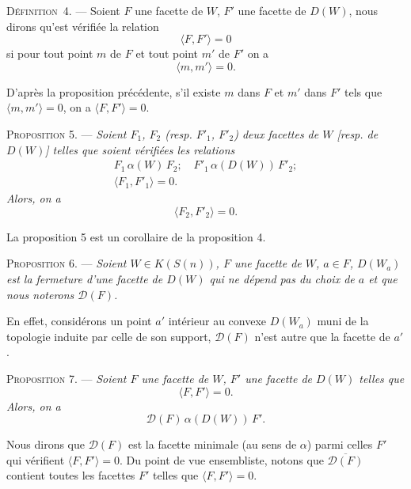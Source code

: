 \documentclass[11pt]{article}
\newcommand{\bzcf}[2]{#1}
\newcommand{\Dc}{\mathcal{D}}
\newcommand{\bznum}[1]{\if\relax\detokenize{#1}\relax\else\ #1\fi}
\newenvironment{defin}[1][]{\par\medskip\noindent\textsc{Définition\bznum{#1}.} --- }{\par\medskip}
\newenvironment{prop}[1][]{\par\medskip\noindent\textsc{Proposition #1.} --- \itshape}{\par\medskip}
\newenvironment{proof}[1][]{\par}{\par}
\begin{document}
\begin{defin}[4]
Soient $F$ une facette de $W$, $F'$ une facette de $D(W)$, nous dirons qu'est vérifiée la
relation
\[ \langle F, F'\rangle=0 \]
si pour tout point $m$ de $F$ et tout point $m'$ de $F'$ on a
\[ \langle m, m'\rangle=0. \]
\end{defin}

D'après \bzcf{la proposition précédente}{\ref{bzprop:c3s4p4_orthogonalite_facettes}}, s'il existe
$m$ dans $F$ et $m'$ dans $F'$ tels que $\langle m, m'\rangle=0$, on a $\langle F, F'\rangle=0$.

\begin{prop}[5]
Soient $F_1$, $F_2$ (resp. $F'_1$, $F'_2$) deux facettes de $W$ [resp. de $D(W)$] telles que soient
vérifiées les relations
\[ \begin{gathered} F_1\,\alpha(W)\,F_2;\quad F'_1\,\alpha(D(W))\,F'_2;\\ \langle F_1,
F'_1\rangle=0. \end{gathered} \]
Alors, on a
\[ \langle F_2, F'_2\rangle=0. \]
\end{prop}

\begin{proof}
La proposition 5 est un corollaire de \bzcf{la proposition
4}{\ref{bzprop:c3s4p4_orthogonalite_facettes}}.
\end{proof}

\begin{prop}[6]
Soient $W\in K(S(n))$, $F$ une facette de $W$, $a\in F$, $D(W_a)$ est la fermeture d'une facette
de $D(W)$ qui ne dépend pas du choix de $a$ et que nous noterons $\Dc(F)$.
\end{prop}

\begin{proof}
En effet, considérons un point $a'$ intérieur au convexe $D(W_a)$ muni de la topologie induite par
celle de son support, $\Dc(F)$ n'est autre que la facette de $a'$.
\end{proof}

\begin{prop}[7]
Soient $F$ une facette de $W$, $F'$ une facette de $D(W)$ telles que
\[ \langle F, F'\rangle=0. \]
Alors, on a
\[ \Dc(F)\,\alpha(D(W))\,F'. \]
\end{prop}

Nous dirons que $\Dc(F)$ est la facette minimale (au sens de $\alpha$) parmi celles $F'$ qui
vérifient $\langle F, F'\rangle=0$. Du point de vue ensembliste, notons que $\overline{\Dc(F)}$
contient toutes les facettes $F'$ telles que $\langle F, F'\rangle=0$.
\end{document}
